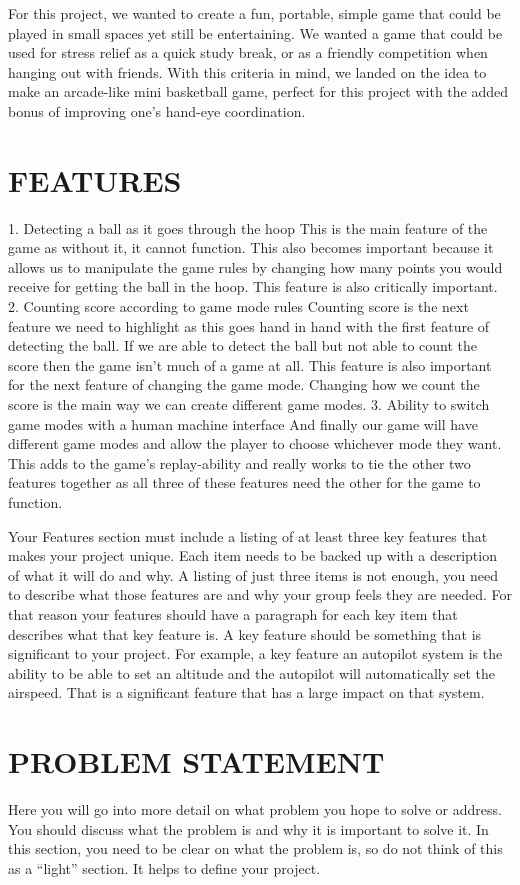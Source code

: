 \documentclass[12pt]{article}
\begin{document}
For this project, we wanted to create a fun, portable, simple game that could be played in small spaces yet still be entertaining. We wanted a game that could be used for stress relief as a quick study break, or as a friendly competition when hanging out with friends. With this criteria in mind, we landed on the idea to make an arcade-like mini basketball game, perfect for this project with the added bonus of improving one's hand-eye coordination. 

\section{FEATURES}
1. Detecting a ball as it goes through the hoop
    This is the main feature of the game as without it, it cannot function. This also becomes important because it allows us to manipulate the game rules by changing how many points you would receive for getting the ball in the hoop. This feature is also critically important.
2. Counting score according to game mode rules
	Counting score is the next feature we need to highlight as this goes hand in hand with the first feature of detecting the ball. If we are able to detect the ball but not able to count the score then the game isn't much of a game at all. This feature is also important for the next feature of changing the game mode. Changing how we count the score is the main way we can create different game modes.
3. Ability to switch game modes with a human machine interface
	And finally our game will have different game modes and allow the player to choose whichever mode they want. This adds to the game's replay-ability and really works to tie the other two features together as all three of these features need the other for the game to function. 

Your Features section must include a listing of at least three key features that makes your project unique. Each item needs to be backed up with a description of what it will do and why. A listing of just three items is not enough, you need to describe what those features are and why your group feels they are needed. For that reason your features should have a paragraph for each key item that describes what that key feature is. A key feature should be something that is significant to your project. For example, a key feature an autopilot system is the ability to be able to set an altitude and the autopilot will automatically set the airspeed. That is a significant feature that has a large impact on that system.


\section{PROBLEM STATEMENT}
Here you will go into more detail on what problem you hope to solve or address.  You should discuss what the problem is and why it is important to solve it. In this section, you need to be clear on what the problem is, so do not think of this as a ``light'' section. It helps to define your project.
\end{document}
